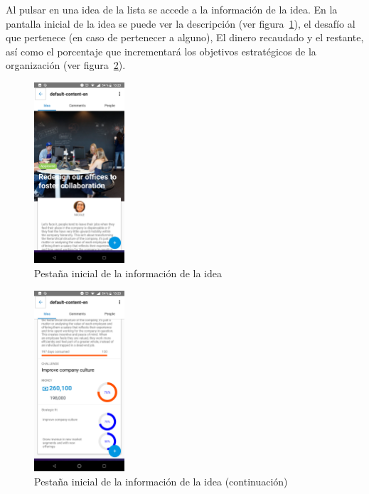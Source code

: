 Al pulsar en una idea de la lista se accede a la información de la idea. En la pantalla inicial 
de la idea se puede ver la descripción (ver figura~\ref{fig:ver_idea_inicio}), el desafío al que 
pertenece (en caso de pertenecer a alguno), El dinero recaudado y el restante, así como el porcentaje 
que incrementará los objetivos estratégicos de la organización (ver figura~\ref{fig:ver_idea_inicio_cont}).

\begin{figure}[!h]
	\begin{center}
		\includegraphics[width=0.3\textwidth]{./img/anexo1/ver_idea_inicio.png}
		\caption{Pestaña inicial de la información de la idea}
		\label{fig:ver_idea_inicio}
	\end{center}
\end{figure}

\begin{figure}[!h]
	\begin{center}
		\includegraphics[width=0.3\textwidth]{./img/anexo1/ver_idea_inicio_cont.png}
		\caption{Pestaña inicial de la información de la idea (continuación)}
		\label{fig:ver_idea_inicio_cont}
	\end{center}
\end{figure}

